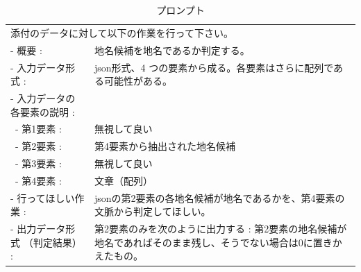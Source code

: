 \begin{table}[h]
\begin{center}
\caption{プロンプト} \label{tab:prompt}
\begin{tabular}{lp{86mm}}
\multicolumn{2}{l}{添付のデータに対して以下の作業を行って下さい。} \\
- 概要 : & 地名候補を地名であるか判定する。 \\
- 入力データ形式 : & json形式、4 つの要素から成る。各要素はさらに配列である可能性がある。 \\
- 入力データの各要素の説明 : & {}  \\
\ - 第1要素 : & 無視して良い \\
\ - 第2要素 : & 第4要素から抽出された地名候補 \\
\ - 第3要素 : & 無視して良い \\
\ - 第4要素 : & 文章（配列） \\
- 行ってほしい作業 : & jsonの第2要素の各地名候補が地名であるかを、第4要素の文脈から判定してほしい。 \\
- 出力データ形式 （判定結果） : & 第2要素のみを次のように出力する : 第2要素の地名候補が地名であればそのまま残し、そうでない場合は0に置きかえたもの。 \\
\end{tabular}
\end{center}
\end{table}
